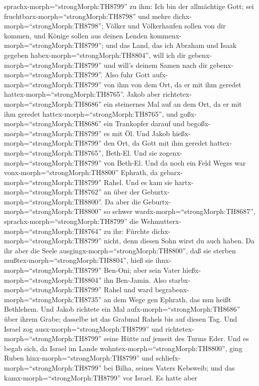 sprachx-morph=``strongMorph:TH8799'' zu ihm: Ich bin der allmächtige
Gott; sei fruchtbarx-morph=``strongMorph:TH8798'' und mehre
dichx-morph=``strongMorph:TH8798''; Völker und Völkerhaufen sollen von
dir kommen, und Könige sollen aus deinen Lenden
kommenx-morph=``strongMorph:TH8799'';  und das Land, das
ich Abraham und Isaak gegeben habex-morph=``strongMorph:TH8804'', will
ich dir gebenx-morph=``strongMorph:TH8799'' und will's deinem Samen nach
dir gebenx-morph=``strongMorph:TH8799''.  Also fuhr Gott
aufx-morph=``strongMorph:TH8799'' von ihm von dem Ort, da er mit ihm
geredet hattex-morph=``strongMorph:TH8765''.  Jakob aber
richtetex-morph=``strongMorph:TH8686'' ein steinernes Mal auf an dem
Ort, da er mit ihm geredet hattex-morph=``strongMorph:TH8765'', und
goßx-morph=``strongMorph:TH8686'' ein Trankopfer darauf und
begoßx-morph=``strongMorph:TH8799'' es mit Öl.  Und Jakob
hießx-morph=``strongMorph:TH8799'' den Ort, da Gott mit ihm geredet
hattex-morph=``strongMorph:TH8765'', Beth-El.  Und sie
zogenx-morph=``strongMorph:TH8799'' von Beth-El. Und da noch ein Feld
Weges war vonx-morph=``strongMorph:TH8800'' Ephrath, da
gebarx-morph=``strongMorph:TH8799'' Rahel.  Und es kam sie
hartx-morph=``strongMorph:TH8762'' an über der
Geburtx-morph=``strongMorph:TH8800''. Da aber die
Geburtx-morph=``strongMorph:TH8800'' so schwer
wardx-morph=``strongMorph:TH8687'', sprachx-morph=``strongMorph:TH8799''
die Wehmutterx-morph=``strongMorph:TH8764'' zu ihr: Fürchte
dichx-morph=``strongMorph:TH8799'' nicht, denn diesen Sohn wirst du auch
haben.  Da ihr aber die Seele
ausgingx-morph=``strongMorph:TH8800'', daß sie sterben
mußtex-morph=``strongMorph:TH8804'', hieß sie
ihnx-morph=``strongMorph:TH8799'' Ben-Oni; aber sein Vater
hießx-morph=``strongMorph:TH8804'' ihn Ben-Jamin.  Also
starbx-morph=``strongMorph:TH8799'' Rahel und ward
begrabenx-morph=``strongMorph:TH8735'' an dem Wege gen Ephrath, das nun
heißt Bethlehem.  Und Jakob richtete ein Mal
aufx-morph=``strongMorph:TH8686'' über ihrem Grabe; dasselbe ist das
Grabmal Rahels bis auf diesen Tag.  Und Israel zog
ausx-morph=``strongMorph:TH8799'' und
richtetex-morph=``strongMorph:TH8799'' seine Hütte auf jenseit des Turms
Eder.  Und es begab sich, da Israel im Lande
wohntex-morph=``strongMorph:TH8800'', ging Ruben
hinx-morph=``strongMorph:TH8799'' und
schliefx-morph=``strongMorph:TH8799'' bei Bilha, seines Vaters Kebsweib;
und das kamx-morph=``strongMorph:TH8799'' vor Israel. Es hatte aber
